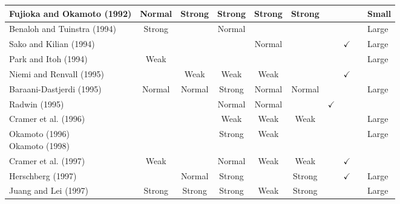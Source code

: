 \documentclass[../access.tex]{subfiles}
\begin{document}
\begin{table}[htbp]
\begin{adjustwidth}{-2cm}{}
\begin{tabular}{m{4.4cm} c c c c c c c c >{\centering\arraybackslash}m{1cm}}
                    \hline
                    \footnotesize{Fujioka and Okamoto (1992) \cite{Fujioka1992}} & {Normal} & {Strong} & {Strong} & {Strong} & {Strong} & {} & {} & {} & \footnotesize{Small} \\
                    \hline
                    \footnotesize{Benaloh and Tuinstra (1994) \cite{Benaloh1994}} & {Strong} & {} & {Normal} & {} & {} & {} & {} & {} & \footnotesize{Large} \\
                    \hline
                    \footnotesize{Sako and Kilian (1994) \cite{Sako1994}} & {} & {} & {} & {Normal} & {} & {} & $ \checkmark $ & {} & \footnotesize{Large} \\
                    \hline
                    \footnotesize{Park and Itoh (1994) \cite{Park1994}} & {Weak} & {} & {} & {} & {} & {} & {} & {} & \footnotesize{Large} \\
                    \hline
                    \footnotesize{Niemi and Renvall (1995) \cite{Niemi1995}} & {} & {Weak} & {Weak} & {Weak} & {} & {} & $ \checkmark $ & {} & \\
                    \hline
                    \footnotesize{Baraani-Dastjerdi (1995) \cite{Baraani1995}} & {Normal} & {Normal} & {Strong} & {Normal} & {Normal} & {} & {} & {} & \footnotesize{Large} \\
                    \hline
                    \footnotesize{Radwin (1995) \cite{Radwin1995}} & {} & {} & {Normal} & {Normal} & {} & $ \checkmark $ & {} & {} & \\
                    \hline
                    \footnotesize{Cramer et al. (1996) \cite{Cramer1996}} & {} & {} & {Weak} & {Weak} & {Weak} & {} & {} & {} & \footnotesize{Large} \\
                    \hline
                    \parbox[t]{4cm}{\footnotesize{Okamoto (1996) \cite{Okamoto1996}\\Okamoto (1998) \cite{Okamoto1998}}} & {} & {} & {Strong} & {Weak} & {} & {} & {} & {} & \footnotesize{Large} \\
                    \hline
                    \footnotesize{Cramer et al. (1997) \cite{Cramer1997}} & {Weak} & {} & {Normal} & {Weak} & {Weak} & {} & $ \checkmark $ & {} & \\
                    \hline
                    \footnotesize{Herschberg (1997) \cite{Herschberg1997}} & {} & {Normal} & {Strong} & {} & {Strong} & {} & $ \checkmark $ & {} & \footnotesize{Large} \\
                    \hline
                    \footnotesize{Juang and Lei (1997) \cite{Juang1997}} & {Strong} & {Strong} & {Strong} & {Weak} & {Strong} & {} & {} & {} & \footnotesize{Large} \\

\end{tabular}
\end{adjustwidth}
\end{table}
\end{document}
